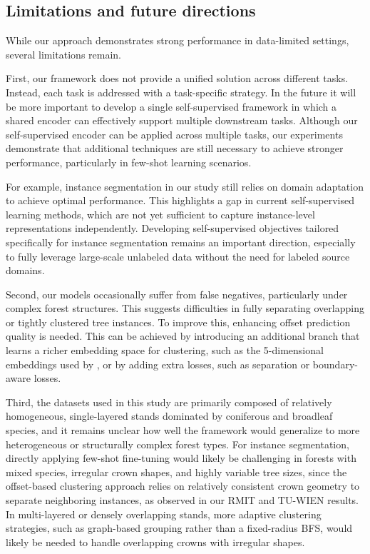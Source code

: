 \documentclass[review,authoryear]{elsarticle}
\begin{document}
\subsection{Limitations and future directions}
While our approach demonstrates strong performance in data-limited settings, several limitations remain. 

First, our framework does not provide a unified solution across different tasks. Instead, each task is addressed with a task-specific strategy. In the future it will be more important to develop a single self-supervised framework in which a shared encoder can effectively support multiple downstream tasks. Although our self-supervised encoder can be applied across multiple tasks, our experiments demonstrate that additional techniques are still necessary to achieve stronger performance, particularly in few-shot learning scenarios.

For example, instance segmentation in our study still relies on domain adaptation to achieve optimal performance. This highlights a gap in current self-supervised learning methods, which are not yet sufficient to capture instance-level representations independently. Developing self-supervised objectives tailored specifically for instance segmentation remains an important direction, especially to fully leverage large-scale unlabeled data without the need for labeled source domains. 

Second, our models occasionally suffer from false negatives, particularly under complex forest structures. This suggests difficulties in fully separating overlapping or tightly clustered tree instances. To improve this, enhancing offset prediction quality is needed. This can be achieved by introducing an additional branch that learns a richer embedding space for clustering, such as the 5-dimensional embeddings used by \cite{XIANG2024114078}, or by adding extra losses, such as separation or boundary-aware losses. 

Third, the datasets used in this study are primarily composed of relatively homogeneous, single-layered stands dominated by coniferous and broadleaf species, and it remains unclear how well the framework would generalize to more heterogeneous or structurally complex forest types. For instance segmentation, directly applying few-shot fine-tuning would likely be challenging in forests with mixed species, irregular crown shapes, and highly variable tree sizes, since the offset-based clustering approach relies on relatively consistent crown geometry to separate neighboring instances, as observed in our RMIT and TU-WIEN results. In multi-layered or densely overlapping stands, more adaptive clustering strategies, such as graph-based grouping rather than a fixed-radius BFS, would likely be needed to handle overlapping crowns with irregular shapes.
\end{document}
